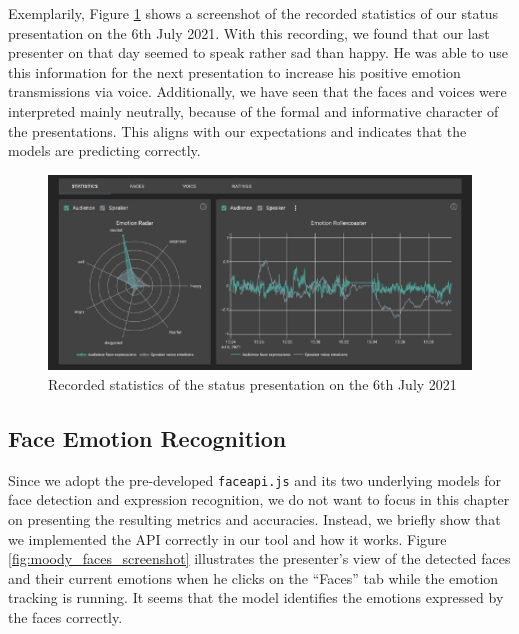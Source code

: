 Exemplarily, Figure \ref{fig:moody_statistics_screenshot} shows a screenshot of the recorded statistics of our status presentation on the 6th July 2021. With this recording, we found that our last presenter on that day seemed to speak rather sad than happy. He was able to use this information for the next presentation to increase his positive emotion transmissions via voice. Additionally, we have seen that the faces and voices were interpreted mainly neutrally, because of the formal and informative character of the presentations. This aligns with our expectations and indicates that the models are predicting correctly.

\begin{figure}
\centering
\includegraphics[width=1\textwidth]{assets/moody_statistics_screenshot.png}
\caption{Recorded statistics of the status presentation on the 6th July 2021}
\label{fig:moody_statistics_screenshot}
\end{figure}

\subsection{Face Emotion Recognition}
\label{subsec:results_face_emotion_recognition}
Since we adopt the pre-developed \texttt{faceapi.js} and its two underlying models for face detection and expression recognition, we do not want to focus in this chapter on presenting the resulting metrics and accuracies. Instead, we briefly show that we implemented the API correctly in our tool and how it works. Figure \ref{fig:moody_faces_screenshot} illustrates the presenter's view of the detected faces and their current emotions when he clicks on the ``Faces'' tab while the emotion tracking is running. It seems that the model identifies the emotions expressed by the faces correctly.

